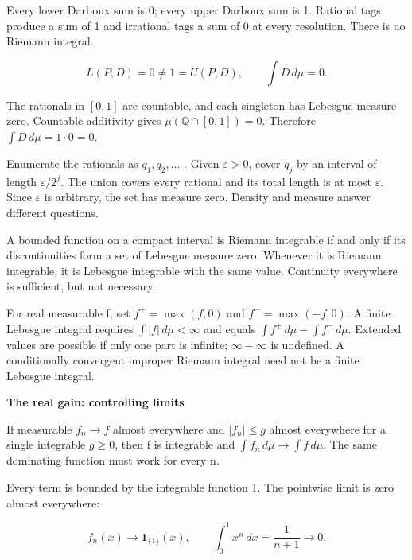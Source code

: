 \documentclass[11pt,a4paper]{article}
\newcommand{\topic}[1]{\vspace{6pt}{\large\bfseries #1}\par}
\newcommand{\pagetitle}[1]{{\LARGE\bfseries #1}\par\vspace{9pt}}
\begin{document}
Every lower Darboux sum is 0; every upper Darboux sum is 1. Rational tags produce a sum of 1 and irrational tags a sum of 0 at every resolution. There is no Riemann integral.

\[L(P,D)=0\ne1=U(P,D),\qquad \int D\,d\mu=0.\]

The rationals in \([0,1]\) are countable, and each singleton has Lebesgue measure zero. Countable additivity gives \(\mu(\mathbb Q\cap[0,1])=0\). Therefore \(\int D\,d\mu=1\cdot0=0\).

\topic{Measure zero does not mean empty}

Enumerate the rationals as \(q_1,q_2,\ldots\) . Given \(\varepsilon>0\), cover \(q_j\) by an interval of length \(\varepsilon/2^j\). The union covers every rational and its total length is at most \(\varepsilon\). Since \(\varepsilon\) is arbitrary, the set has measure zero. Density and measure answer different questions.

\topic{When they agree}

A bounded function on a compact interval is Riemann integrable if and only if its discontinuities form a set of Lebesgue measure zero. Whenever it is Riemann integrable, it is Lebesgue integrable with the same value. Continuity everywhere is sufficient, but not necessary.

\topic{Signed and improper integrals}

For real measurable f, set \(f^+=\max(f,0)\) and \(f^-=\max(-f,0)\). A finite Lebesgue integral requires \(\int|f|\,d\mu<\infty\) and equals \(\int f^+\,d\mu-\int f^-\,d\mu\). Extended values are possible if only one part is infinite; \(\infty-\infty\) is undefined. A conditionally convergent improper Riemann integral need not be a finite Lebesgue integral.

\newpage

\pagetitle{The real gain: controlling limits}

\topic{Dominated convergence}

If measurable \(f_n\to f\) almost everywhere and \(|f_n|\le g\) almost everywhere for a single integrable \(g\ge0\), then f is integrable and \(\int f_n\,d\mu\to\int f\,d\mu\). The same dominating function must work for every n.

\topic{$f_n(x)=x^n$}

Every term is bounded by the integrable function 1. The pointwise limit is zero almost everywhere:

\[f_n(x)\longrightarrow\mathbf1_{\{1\}}(x),\qquad\int_0^1x^n\,dx=\frac1{n+1}\longrightarrow0.\]
\end{document}
